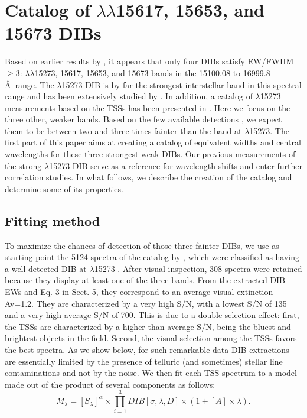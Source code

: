 \documentclass[printer]{aa} %
\begin{document}
\section{Catalog of $\lambda\lambda$15617, 15653, and 15673 DIBs \label{seccatalog}}
Based on earlier results by \cite{Cox14}, it appears that only four DIBs satisfy EW/FWHM $\geq 3$:   $ \lambda\lambda$15273, 15617, 15653, and 15673 bands in the 15100.08 to 16999.8 \AA\ range. The $\lambda$15273 DIB  is by far the strongest interstellar band in this spectral range and has been extensively studied by \cite{Zasowski15}. In addition, a catalog of $\lambda$15273 measurements based on the TSSs has been presented in \cite{Elyajouri16}. Here we focus on the three other, weaker bands. Based on the few available detections \citep{Geballe11,Cox14}, we expect them to be between two and three times fainter than the band at $\lambda$15273. The first part of this paper aims at creating a catalog of equivalent widths and central wavelengths for these three strongest-weak DIBs. Our previous measurements of the strong $\lambda$15273 DIB serve as a reference for wavelength shifts and enter further correlation studies. 
In what follows, we describe the creation of the catalog and determine some of its properties.
\subsection{Fitting method}
To maximize the chances of detection of those three fainter DIBs, we use as starting point the 5124 spectra of the catalog by \citet{Elyajouri16},
which were classified as having a well-detected DIB at $\lambda$15273 . After visual inspection, 308 spectra were retained because
they display at least one of the three bands. From the extracted DIB EWs and Eq. 3 in Sect. 5, they correspond to an average visual extinction Av=1.2.  They are characterized by a very high S/N, with a lowest S/N of 135 and a very high average S/N of 700. This is due to a double selection effect: first, the TSSs are characterized by a higher than average S/N, being the bluest and brightest objects in the field. Second, the visual selection among the TSSs favors the best spectra. As we show
below, for such remarkable data DIB extractions are essentially limited by the presence of telluric (and sometimes) stellar line contaminations and not by the noise. We then fit each TSS spectrum to a model made out of the product of several components as follows:
\begin{equation}
M_\lambda= [S_\lambda]^\alpha \times \prod_{i=1}^{3}{DIB[\sigma,\lambda,D]}  \times (1+[A] \times \lambda)
\label{fit}
.\end{equation}
\end{document}
